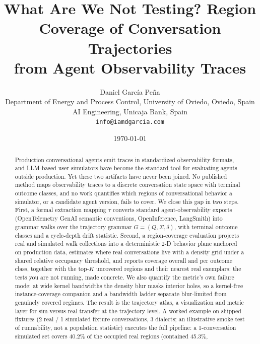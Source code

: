 \documentclass[11pt,a4paper]{article}
\title{What Are We Not Testing? Region Coverage of Conversation Trajectories\\ from Agent Observability Traces}
\author{Daniel Garc\'ia Pe\~na\\
  \small Department of Energy and Process Control, University of Oviedo, Oviedo, Spain\\
  \small AI Engineering, Unicaja Bank, Spain\\
  \texttt{info@iamdgarcia.com}}
\date{\today}
\theoremstyle{definition}
\begin{document}
\maketitle

\begin{abstract}
Production conversational agents emit traces in standardized observability formats, and
LLM-based user simulators have become the standard tool for evaluating agents outside
production.
Yet these two artifacts have never been joined.
No published method maps observability traces to a discrete conversation state space with
terminal outcome classes, and no work quantifies which regions of conversational behavior a
simulator, or a candidate agent version, fails to cover.
We close this gap in two steps.
First, a formal extraction mapping $\tau$ converts standard agent-observability exports
(OpenTelemetry GenAI semantic conventions, OpenInference, LangSmith) into grammar walks over
the trajectory grammar $G=(Q,\Sigma,\delta)$, with terminal outcome classes and a cycle-depth
drift statistic.
Second, a region-coverage evaluation projects real and simulated walk collections into a
deterministic 2-D behavior plane anchored on production data, estimates where real
conversations live with a density grid under a shared relative occupancy threshold, and
reports coverage overall and per outcome class, together with the top-$K$ uncovered regions
and their nearest real exemplars: the tests you are not running, made concrete.
We also quantify the metric's own failure mode: at wide kernel bandwidths the density blur masks interior holes, so a kernel-free instance-coverage companion and a bandwidth ladder separate blur-limited from genuinely covered regimes.
The result is the trajectory atlas, a visualization and metric layer for sim-versus-real
transfer at the trajectory level.
A worked example on shipped fixtures (2 real / 1 simulated fixture conversations, 3 dialects;
an illustrative smoke test of runnability, not a population statistic) executes the full pipeline:
a 1-conversation simulated set covers 40.2\% of the occupied real regions (contained 45.3\%,

\end{abstract}
\end{document}
